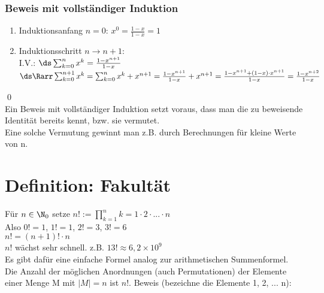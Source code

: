 \subsubsection*{Beweis mit vollständiger Induktion}
\begin{enumerate}
\item Induktionsanfang $n = 0$: $x^0 = \frac{1 - x}{1 - x} = 1$
\item Induktionsschritt $n \to n + 1$:\\
I.V.: $\ds\sum_{k = 0}^{n} x^k = \frac{1 - x^{n+1}}{1 - x}$\\
$\ds\Rarr \sum_{k = 0}^{n + 1} x^k = \sum_{k = 0}^{n} x^k + x^{n+1} = \frac{1 - x^{n+1}}{1 - x} + x^{n+1} 
= \frac{1 - x^{n+1} + (1-x)\cdot x^{n+1}}{1 - x} = \frac{1 - x^{n+2}}{1 - x}$
\end{enumerate}
\qed\\
Ein Beweis mit vollständiger Induktion setzt voraus, dass man die zu beweisende Identität bereits kennt, bzw. sie vermutet.\\
Eine solche Vermutung gewinnt man z.B. durch Berechnungen für kleine Werte von n.
\section{Definition: Fakultät}
Für $n \in \N_0$ setze $n! := \prod_{k=1}^{n} k = 1 \cdot 2 \cdot ... \cdot n$\\
Also $0! = 1$, $1! = 1$, $2! = 3$, $3! = 6$\\
$n! = (n+1)! \cdot n$\\
$n!$ wächst sehr schnell. z.B. $13! \approx 6,2 \times 10^9$\\
Es gibt dafür eine einfache Formel analog zur arithmetischen Summenformel.\\
\Satz
Die Anzahl der möglichen Anordnungen (auch Permutationen) der Elemente einer Menge M mit $|M| = n$ ist $n!$.
Beweis (bezeichne die Elemente 1, 2, ... n):
